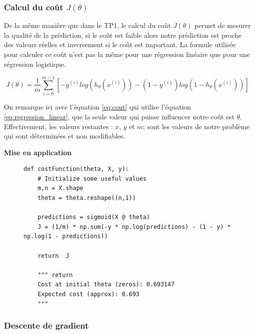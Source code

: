     \subsubsection{Calcul du coût $J(\theta)$}
    De la même manière que dans le TP1, le calcul du coût $J(\theta)$ permet de mesurer la qualité de la prédiction, si le coût est faible alors notre prédiction est proche des valeurs réelles et inversement si le coût est important. La formule utilisée pour calculer ce coût n'est pas la même pour une régression linéaire que pour une régression logistique. 
    
    \begin{equation}\label{eq:cout}
       J(\theta) = \frac{1}{m} \sum_{i=0}^{m-1}[-y^{(i)} log(h_\theta(x^{(i)})) - (1-y^{(i)}) log(1-h_\theta(x^{(i)}))]
    \end{equation}
 
    On remarque ici avec l'équation \ref{eq:cout} qui utilise l'équation \ref{eq:regression_linear}, que la seule valeur qui puisse influencer notre coût est $\theta$. Effectivement, les valeurs restantes : $x$, $y$ et $m$; sont les valeurs
    de notre problème qui sont déterminées et non modifiables.
    
    
    \vspace{.5cm}
    \noindent
    \textbf{Mise en application}
    \vspace{.2cm}

\begin{figure}[!h]
\begin{verbatim}
def costFunction(theta, X, y):
    # Initialize some useful values
    m,n = X.shape   
    theta = theta.reshape((n,1)) 
                
    predictions = sigmoid(X @ theta)
    J = (1/m) * np.sum(-y * np.log(predictions) - (1 - y) * np.log(1 - predictions))
    
    return  J

    """ return
    Cost at initial theta (zeros): 0.693147
    Expected cost (approx): 0.693
    """
\end{verbatim}   
\end{figure}

\clearpage

\subsubsection{Descente de gradient}

